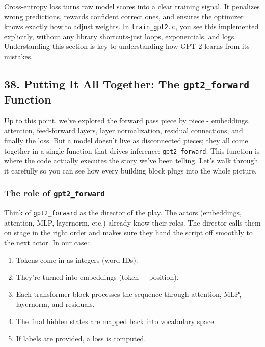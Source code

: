\documentclass[
  letterpaper,
  DIV=11,
  numbers=noendperiod]{scrreprt}
\providecommand{\tightlist}{%
  \setlength{\itemsep}{0pt}\setlength{\parskip}{0pt}}
\begin{document}
Cross-entropy loss turns raw model scores into a clear training signal.
It penalizes wrong predictions, rewards confident correct ones, and
ensures the optimizer knows exactly how to adjust weights. In
\texttt{train\_gpt2.c}, you see this implemented explicitly, without any
library shortcuts-just loops, exponentials, and logs. Understanding this
section is key to understanding how GPT-2 learns from its mistakes.

\subsection{\texorpdfstring{38. Putting It All Together: The
\texttt{gpt2\_forward}
Function}{38. Putting It All Together: The gpt2\_forward Function}}\label{putting-it-all-together-the-gpt2_forward-function}

Up to this point, we've explored the forward pass piece by piece -
embeddings, attention, feed-forward layers, layer normalization,
residual connections, and finally the loss. But a model doesn't live as
disconnected pieces; they all come together in a single function that
drives inference: \texttt{gpt2\_forward}. This function is where the
code actually executes the story we've been telling. Let's walk through
it carefully so you can see how every building block plugs into the
whole picture.

\subsubsection{\texorpdfstring{The role of
\texttt{gpt2\_forward}}{The role of gpt2\_forward}}\label{the-role-of-gpt2_forward}

Think of \texttt{gpt2\_forward} as the director of the play. The actors
(embeddings, attention, MLP, layernorm, etc.) already know their roles.
The director calls them on stage in the right order and makes sure they
hand the script off smoothly to the next actor. In our case:

\begin{enumerate}
\def\labelenumi{\arabic{enumi}.}
\tightlist
\item
  Tokens come in as integers (word IDs).
\item
  They're turned into embeddings (token + position).
\item
  Each transformer block processes the sequence through attention, MLP,
  layernorm, and residuals.
\item
  The final hidden states are mapped back into vocabulary space.
\item
  If labels are provided, a loss is computed.
\end{enumerate}
\end{document}
